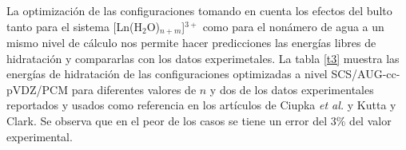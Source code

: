 La optimizaci\'on de las configuraciones tomando en cuenta los 
efectos del bulto tanto para el sistema [Ln(H$_2$O)$_{n+m}$]$^{3+}$
como para el non\'amero de agua a un mismo nivel de c\'alculo nos
permite hacer predicciones las energ\'ias libres de hidrataci\'on y 
compararlas con los datos experimetales. La tabla \ref{t3} muestra 
las energ\'ias de hidrataci\'on de las configuraciones optimizadas a 
nivel SCS/AUG-cc-pVDZ/PCM para diferentes valores de $n$ y dos de los
datos experimentales reportados y usados como referencia en los 
art\'iculos de Ciupka {\it et al.} y Kutta y Clark. Se observa que en
el peor de los casos se tiene un error del 3\% del valor experimental.
%
%

